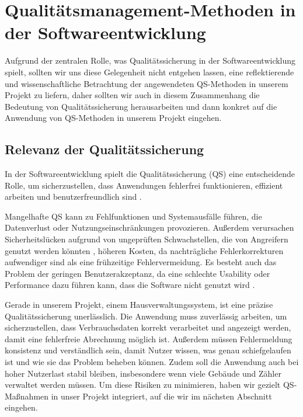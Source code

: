 \newpage
\section{Qualitätsmanagement-Methoden in der Softwareentwicklung}\label{sec:qualitatsmanagement-methoden-in-der-softwareentwicklung}

Aufgrund der zentralen Rolle, was Qualitätssicherung in der Softwareentwicklung spielt, sollten wir uns diese Gelegenheit nicht entgehen lassen, eine reflektierende und wissenschaftliche Betrachtung der angewendeten QS-Methoden in unserem Projekt zu liefern, daher sollten wir auch
in diesem Zusammenhang die Bedeutung von Qualitätssicherung herausarbeiten und dann konkret auf die Anwendung von QS-Methoden in unserem Projekt eingehen.


\subsection{Relevanz der Qualitätssicherung}\label{subsec:relevanz-der-qualitatssicherung}

In der Softwareentwicklung spielt die Qualitätssicherung (QS) eine entscheidende Rolle, um sicherzustellen, dass Anwendungen fehlerfrei funktionieren, effizient arbeiten und benutzerfreundlich sind \cite{DaiglGlunz2024}.

Mangelhafte QS kann zu Fehlfunktionen und Systemausfälle führen, die Datenverlust oder Nutzungseinschränkungen provozieren.
Außerdem verursachen Sicherheitslücken aufgrund von ungeprüften Schwachstellen, die von Angreifern genutzt werden könnten \cite{DaiglGlunz2024},
höheren Kosten, da nachträgliche Fehlerkorrekturen aufwendiger sind als eine frühzeitige Fehlervermeidung.
Es besteht auch das Problem der geringen Benutzerakzeptanz, da eine schlechte Usability oder Performance dazu führen kann, dass die Software nicht genutzt wird \cite{Röttgeretal2024}.

Gerade in unserem Projekt, einem Hausverwaltungssystem, ist eine präzise Qualitätssicherung unerlässlich.
Die Anwendung muss zuverlässig arbeiten, um sicherzustellen, dass Verbrauchsdaten korrekt verarbeitet und angezeigt werden, damit eine fehlerfreie Abrechnung möglich ist.
Außerdem müssen Fehlermeldung konsistenz und verständlich sein, damit Nutzer wissen, was genau schiefgelaufen ist und wie sie das Problem beheben können.
Zudem soll die Anwendung auch bei hoher Nutzerlast stabil bleiben, insbesondere wenn viele Gebäude und Zähler verwaltet werden müssen.
Um diese Risiken zu minimieren, haben wir gezielt QS-Maßnahmen in unser Projekt integriert, auf die wir im nächsten Abschnitt eingehen.

